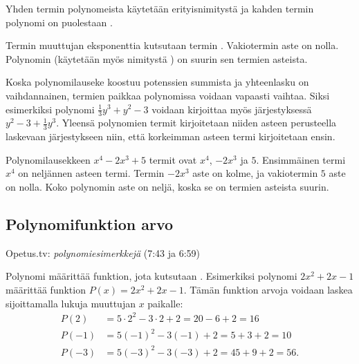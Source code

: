 Yhden termin polynomeista käytetään erityisnimitystä  ja kahden termin polynomi on puolestaan .

Termin muuttujan eksponenttia kutsutaan termin .
Vakiotermin aste on nolla.
Polynomin  (käytetään myös nimitystä ) on suurin sen termien asteista.

Koska polynomilauseke koostuu potenssien summista ja yhteenlasku on vaihdannainen, termien paikkaa polynomissa voidaan vapaasti vaihtaa. Siksi esimerkiksi polynomi $\frac{1}{3}y^3+y^2-3$ voidaan kirjoittaa myös järjestyksessä $y^2-3+\frac{1}{3}y^3$. Yleensä polynomien termit kirjoitetaan niiden asteen perusteella laskevaan järjestykseen niin, että korkeimman asteen termi kirjoitetaan ensin.

\begin{esimerkki}
Polynomilausekkeen $x^4-2x^3+5$ termit ovat $x^4$, $-2x^3$ ja $5$.
Ensimmäinen termi $x^4$ on neljännen asteen termi. Termin $-2x^3$ aste on kolme, ja vakiotermin $5$ aste on nolla.
Koko polynomin aste on neljä, koska se on termien asteista suurin.
\end{esimerkki}



\subsection*{Polynomifunktion arvo}

{Opetus.tv: \emph{polynomiesimerkkejä} (7:43 ja 6:59)}

Polynomi määrittää funktion, jota kutsutaan . Esimerkiksi polynomi $2x^2+2x-1$ määrittää funktion $P(x)=2x^2+2x-1$. Tämän funktion arvoja voidaan laskea sijoittamalla lukuja muuttujan $x$ paikalle:
\begin{align*}
P(2) & = 5\cdot 2^2-3\cdot 2+2 = 20 - 6 + 2 = 16 \\
P(-1) & = 5(-1)^2-3(-1)+2 = 5 + 3 + 2 = 10 \\
P(-3) & = 5(-3)^2-3(-3)+2 = 45 + 9 + 2 = 56.
\end{align*}

